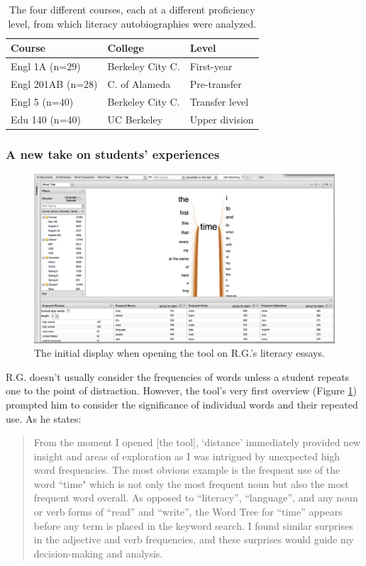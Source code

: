 \documentclass{sig-alternate}
\begin{document}
\begin{table}
\begin{tabular}{lll}
Course& College & Level \\
\hline
Engl 1A (n=29) & Berkeley City C.& First-year \\
Engl 201AB (n=28) & C. of Alameda & Pre-transfer \\
Engl 5 (n=40) & Berkeley City C. & Transfer level \\
Edu 140 (n=40) & UC Berkeley & Upper division \\
\end{tabular}
\caption{The four different courses, each at a different proficiency level, from which literacy autobiographies were analyzed. \label{table:rex-courses}}
\end{table}


 \subsubsection{A new take on students' experiences}

\begin{figure}
\includegraphics[width=\textwidth]{fig/rex/01.png}
\caption{The initial display when opening the tool \label{fig:rex01} on R.G.'s literacy essays.}
\end{figure}

R.G. doesn't usually consider the frequencies of words unless a student repeats one to the point of distraction. However, the tool's very first overview (Figure \ref{fig:rex01}) prompted him to consider the significance of individual words and their repeated use.  As he states:
\begin{quote}
From the moment I opened [the tool], `distance' immediately provided new insight and areas of exploration as I was intrigued by unexpected high word frequencies.  The most obvious example is the frequent use of the word ``time" which is not only the most frequent noun but also the most frequent word overall.  As opposed to ``literacy'', ``language'', and any noun or verb forms of ``read'' and ``write'', the Word Tree for ``time'' appears before any term is placed in the keyword search.   I found similar surprises in the adjective and verb frequencies, and these surprises would guide my decision-making and analysis.
\end{quote}
\end{document}
